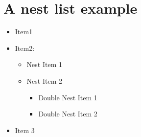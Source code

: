 \documentclass{article}
\begin{document}
\section*{A nest list example}
\begin{itemize}
  \item Item1
  \item Item2:
    \begin{itemize}
      \item Nest Item 1
      \item Nest Item 2
        \begin{itemize}
          \item Double Nest Item 1
          \item Double Nest Item 2
        \end{itemize}
    \end{itemize}
  \item Item 3  
\end{itemize}
\end{document}
